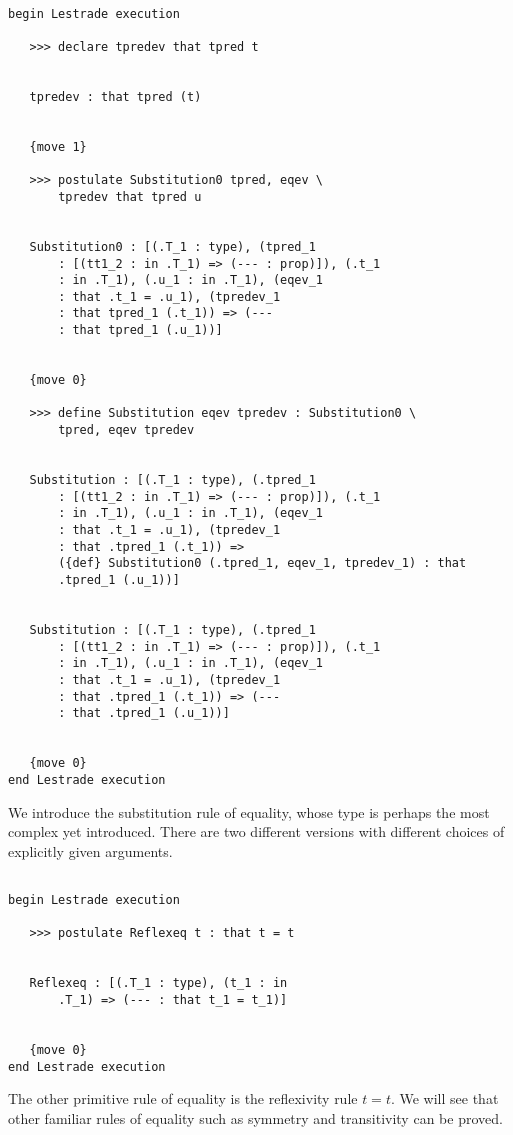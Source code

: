 \documentclass[12pt]{article}
\begin{document}
\begin{verbatim}

begin Lestrade execution

   >>> declare tpredev that tpred t


   tpredev : that tpred (t)


   {move 1}

   >>> postulate Substitution0 tpred, eqev \
       tpredev that tpred u


   Substitution0 : [(.T_1 : type), (tpred_1 
       : [(tt1_2 : in .T_1) => (--- : prop)]), (.t_1 
       : in .T_1), (.u_1 : in .T_1), (eqev_1 
       : that .t_1 = .u_1), (tpredev_1 
       : that tpred_1 (.t_1)) => (--- 
       : that tpred_1 (.u_1))]


   {move 0}

   >>> define Substitution eqev tpredev : Substitution0 \
       tpred, eqev tpredev


   Substitution : [(.T_1 : type), (.tpred_1 
       : [(tt1_2 : in .T_1) => (--- : prop)]), (.t_1 
       : in .T_1), (.u_1 : in .T_1), (eqev_1 
       : that .t_1 = .u_1), (tpredev_1 
       : that .tpred_1 (.t_1)) => 
       ({def} Substitution0 (.tpred_1, eqev_1, tpredev_1) : that 
       .tpred_1 (.u_1))]


   Substitution : [(.T_1 : type), (.tpred_1 
       : [(tt1_2 : in .T_1) => (--- : prop)]), (.t_1 
       : in .T_1), (.u_1 : in .T_1), (eqev_1 
       : that .t_1 = .u_1), (tpredev_1 
       : that .tpred_1 (.t_1)) => (--- 
       : that .tpred_1 (.u_1))]


   {move 0}
end Lestrade execution
\end{verbatim}

We introduce the substitution rule of equality, whose type is perhaps the most complex yet introduced.   There are two different versions with different choices of explicitly given arguments.

\begin{verbatim}

begin Lestrade execution

   >>> postulate Reflexeq t : that t = t


   Reflexeq : [(.T_1 : type), (t_1 : in 
       .T_1) => (--- : that t_1 = t_1)]


   {move 0}
end Lestrade execution
\end{verbatim}

The other primitive rule of equality is the reflexivity rule $t=t$.  We will see that other familiar rules of equality such as symmetry and transitivity can be proved.
\end{document}
